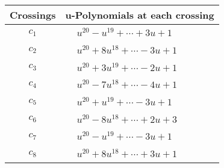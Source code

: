 \documentclass[1p]{elsarticle_modified}
\theoremstyle{definition}
\begin{document}
\begin{tabular}{m{50pt}|m{274pt}}
Crossings & \hspace{64pt}u-Polynomials at each crossing \\
\hline $$\begin{aligned}c_{1}\end{aligned}$$&$\begin{aligned}
&u^{20}- u^{19}+\cdots+3 u+1
\end{aligned}$\\
\hline $$\begin{aligned}c_{2}\end{aligned}$$&$\begin{aligned}
&u^{20}+8 u^{18}+\cdots-3 u+1
\end{aligned}$\\
\hline $$\begin{aligned}c_{3}\end{aligned}$$&$\begin{aligned}
&u^{20}+3 u^{19}+\cdots-2 u+1
\end{aligned}$\\
\hline $$\begin{aligned}c_{4}\end{aligned}$$&$\begin{aligned}
&u^{20}-7 u^{18}+\cdots-4 u+1
\end{aligned}$\\
\hline $$\begin{aligned}c_{5}\end{aligned}$$&$\begin{aligned}
&u^{20}+u^{19}+\cdots-3 u+1
\end{aligned}$\\
\hline $$\begin{aligned}c_{6}\end{aligned}$$&$\begin{aligned}
&u^{20}-8 u^{18}+\cdots+2 u+3
\end{aligned}$\\
\hline $$\begin{aligned}c_{7}\end{aligned}$$&$\begin{aligned}
&u^{20}- u^{19}+\cdots-3 u+1
\end{aligned}$\\
\hline $$\begin{aligned}c_{8}\end{aligned}$$&$\begin{aligned}
&u^{20}+8 u^{18}+\cdots+3 u+1
\end{aligned}$\\

\end{tabular}
\end{document}
